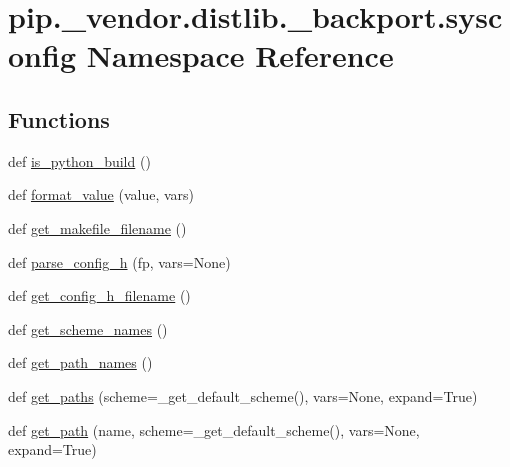 \hypertarget{namespacepip_1_1__vendor_1_1distlib_1_1__backport_1_1sysconfig}{}\section{pip.\+\_\+vendor.\+distlib.\+\_\+backport.\+sysconfig Namespace Reference}
\label{namespacepip_1_1__vendor_1_1distlib_1_1__backport_1_1sysconfig}
\subsection*{Functions}
\begin{DoxyCompactItemize}
\item 
def \hyperlink{namespacepip_1_1__vendor_1_1distlib_1_1__backport_1_1sysconfig_a3a51e461f6287a6ab28211301d3de8d0}{is\+\_\+python\+\_\+build} ()
\item 
def \hyperlink{namespacepip_1_1__vendor_1_1distlib_1_1__backport_1_1sysconfig_a4434c24e192c4dc21ca70389a309c98b}{format\+\_\+value} (value, vars)
\item 
def \hyperlink{namespacepip_1_1__vendor_1_1distlib_1_1__backport_1_1sysconfig_a088aae485c0e31e3cd49080997281543}{get\+\_\+makefile\+\_\+filename} ()
\item 
def \hyperlink{namespacepip_1_1__vendor_1_1distlib_1_1__backport_1_1sysconfig_a5a3a37061ec2d9b2ff8ce688ef2a31b7}{parse\+\_\+config\+\_\+h} (fp, vars=None)
\item 
def \hyperlink{namespacepip_1_1__vendor_1_1distlib_1_1__backport_1_1sysconfig_ac1c0653f6bf7d2c28680558fd6db37bd}{get\+\_\+config\+\_\+h\+\_\+filename} ()
\item 
def \hyperlink{namespacepip_1_1__vendor_1_1distlib_1_1__backport_1_1sysconfig_aa0220cfa78bdd6583651aaa56de76981}{get\+\_\+scheme\+\_\+names} ()
\item 
def \hyperlink{namespacepip_1_1__vendor_1_1distlib_1_1__backport_1_1sysconfig_adfcc7322e702eff9e2dab29c901253ea}{get\+\_\+path\+\_\+names} ()
\item 
def \hyperlink{namespacepip_1_1__vendor_1_1distlib_1_1__backport_1_1sysconfig_ac0a1acd16bd40f3db547376ce31fe1c9}{get\+\_\+paths} (scheme=\+\_\+get\+\_\+default\+\_\+scheme(), vars=None, expand=True)
\item 
def \hyperlink{namespacepip_1_1__vendor_1_1distlib_1_1__backport_1_1sysconfig_a59aa125eaa4f24e4333d8050492643cb}{get\+\_\+path} (name, scheme=\+\_\+get\+\_\+default\+\_\+scheme(), vars=None, expand=True)

\end{DoxyCompactItemize}
